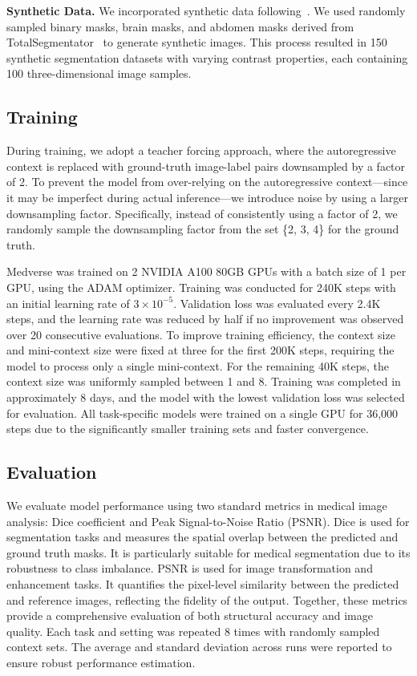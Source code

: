 \vspace{0.4em}
\noindent\textbf{Synthetic Data.}
We incorporated synthetic data following~\cite{butoi2023universeg, hoffmann2021synthmorph}.  
We used randomly sampled binary masks, brain masks, and abdomen masks derived from TotalSegmentator~\cite{wasserthal2023totalsegmentator} to generate synthetic images.  
This process resulted in 150 synthetic segmentation datasets with varying contrast properties, each containing 100 three-dimensional image samples.


\subsection{Training}
During training, we adopt a teacher forcing approach, where the autoregressive context is replaced with ground-truth image-label pairs downsampled by a factor of 2. To prevent the model from over-relying on the autoregressive context—since it may be imperfect during actual inference—we introduce noise by using a larger downsampling factor. Specifically, instead of consistently using a factor of 2, we randomly sample the downsampling factor from the set \{2, 3, 4\} for the ground truth.

Medverse was trained on 2 NVIDIA A100 80GB GPUs with a batch size of 1 per GPU, using the ADAM optimizer.  
Training was conducted for 240K steps with an initial learning rate of $3\times 10^{-5}$.  
Validation loss was evaluated every 2.4K steps, and the learning rate was reduced by half if no improvement was observed over 20 consecutive evaluations.  
To improve training efficiency, the context size and mini-context size were fixed at three for the first 200K steps, requiring the model to process only a single mini-context.  
For the remaining 40K steps, the context size was uniformly sampled between 1 and 8.  
Training was completed in approximately 8 days, and the model with the lowest validation loss was selected for evaluation.
All task-specific models were trained on a single GPU for 36{,}000 steps due to the significantly smaller training sets and faster convergence.

\subsection{Evaluation}
We evaluate model performance using two standard metrics in medical image analysis: Dice coefficient and Peak Signal-to-Noise Ratio (PSNR). Dice is used for segmentation tasks and measures the spatial overlap between the predicted and ground truth masks. It is particularly suitable for medical segmentation due to its robustness to class imbalance. PSNR is used for image transformation and enhancement tasks. It quantifies the pixel-level similarity between the predicted and reference images, reflecting the fidelity of the output. Together, these metrics provide a comprehensive evaluation of both structural accuracy and image quality. Each task and setting was repeated 8 times with randomly sampled context sets.  
The average and standard deviation across runs were reported to ensure robust performance estimation.


